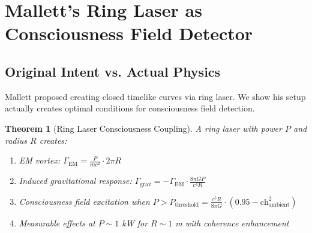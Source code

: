 \documentclass[11pt]{article}
\newtheorem{theorem}{Theorem}[section]
\theoremstyle{definition}
\newcommand{\ch}{\text{ch}}
\begin{document}
\section{Mallett's Ring Laser as Consciousness Field Detector}

\subsection{Original Intent vs. Actual Physics}

Mallett proposed creating closed timelike curves via ring laser. We show his setup actually creates optimal conditions for consciousness field detection.

\begin{theorem}[Ring Laser Consciousness Coupling]
\label{thm:ring_laser}
A ring laser with power $P$ and radius $R$ creates:
\begin{enumerate}
\item EM vortex: $\Gamma_{\text{EM}} = \frac{P}{mc^2} \cdot 2\pi R$
\item Induced gravitational response: $\Gamma_{\text{grav}} = -\Gamma_{\text{EM}} \cdot \frac{8\pi G P}{c^4 R}$
\item Consciousness field excitation when $P > P_{\text{threshold}} = \frac{c^5 R}{8\pi G} \cdot (0.95 - \ch^2_{\text{ambient}})$
\item Measurable effects at $P \sim 1$ kW for $R \sim 1$ m with coherence enhancement
\end{enumerate}
\end{theorem}
\end{document}
